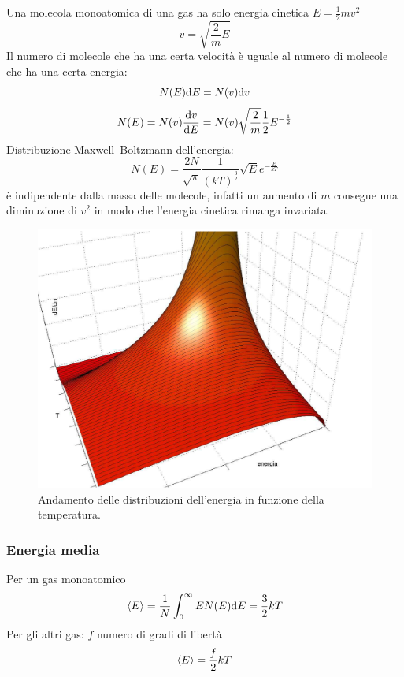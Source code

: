 Una molecola monoatomica di una gas ha solo energia cinetica $E=\frac{1}{2}mv^2$
\[v=\sqrt{\frac{2}{m}E}\]
Il numero di molecole che ha una certa velocità è uguale al numero di molecole che ha una certa energia:
\[N(E)\mathrm{d} E=N(v)\mathrm{d} v\]
\[N(E)=N(v)\frac{\mathrm{d} v}{\mathrm{d} E}=N(v)\sqrt\frac{2}{m}\frac{1}{2}E^{-\frac{1}{2}}\]
Distribuzione Maxwell--Boltzmann dell'energia:
\begin{equation}
   N(E)=\frac{2N}{\sqrt{\pi}}\frac{1}{(kT)^{\frac{3}{2}}}\sqrt{E}e^{-\frac{E}{kT}}
\end{equation}
è indipendente dalla massa delle molecole, infatti un aumento di $m$ consegue una diminuzione di $v^2$ in modo che l'energia cinetica rimanga invariata.
\begin{figure}[htbp]
   \centering
   \includegraphics[scale=0.7]{immagini/fisica1/energia_max3d}
   \caption{Andamento delle distribuzioni dell'energia in funzione della temperatura.}
\end{figure}

\subsubsection{Energia media}
Per un gas monoatomico
\begin{equation}
   \left<E\right>=\frac{1}{N}\int_0^\infty E N(E)\mathrm{d} E=\frac{3}{2}kT
\end{equation}
Per gli altri gas: $f$ numero di gradi di libertà
\begin{equation}
   \left<E\right>=\frac{f}{2}kT
\end{equation}

